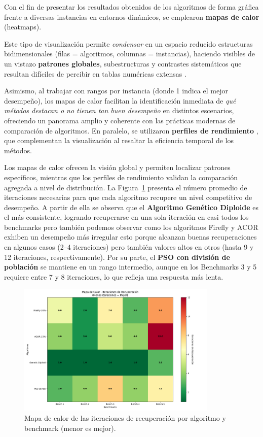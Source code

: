 \documentclass[10pt]{article}
\begin{document}
Con el fin de presentar los resultados obtenidos de los algoritmos de forma gráfica frente a diversas instancias en entornos dinámicos, se emplearon \textbf{mapas de calor} (heatmaps).

Este tipo de visualización permite \textit{condensar} en un espacio reducido estructuras bidimensionales (filas = algoritmos, columnas = instancias), haciendo visibles de un vistazo \textbf{patrones globales}, subestructuras y contrastes sistemáticos que resultan difíciles de percibir en tablas numéricas extensas \citep{wilkinson2009clusterheatmap}. 

Asimismo, al trabajar con rangos por instancia (donde 1 indica el mejor desempeño), los mapas de calor facilitan la identificación inmediata de \textit{qué métodos destacan o no tienen tan buen desempeño} en distintos escenarios, ofreciendo un panorama amplio y coherente con las prácticas modernas de comparación de algoritmos. En paralelo, se utilizaron \textbf{perfiles de rendimiento} \citep{dolan2002performanceprofiles}, que complementan la visualización al resaltar la eficiencia temporal de los métodos. 

Los mapas de calor ofrecen la visión global y permiten localizar patrones específicos, mientras que los perfiles de rendimiento validan la comparación agregada a nivel de distribución. La Figura~\ref{fig:heatmap} presenta el número promedio de iteraciones necesarias para que cada algoritmo recupere un nivel competitivo de desempeño. A partir de ella se observa que el \textbf{Algoritmo Genético Diploide} es el más consistente, logrando recuperarse en una sola iteración en casi todos los benchmarks pero también podemos observar como los algoritmos Firefly y ACOR exhiben un desempeño más irregular esto porque alcanzan buenas recuperaciones en algunos casos (2--4 iteraciones) pero también valores altos en otros (hasta 9 y 12 iteraciones, respectivamente). Por su parte, el \textbf{PSO con división de población} se mantiene en un rango intermedio, aunque en los Benchmarks 3 y 5 requiere entre 7 y 8 iteraciones, lo que refleja una respuesta más lenta.

\begin{figure}[H]
    \centering
    \includegraphics[width=0.85\textwidth]{imagenes/mapaDeCalor.png}
    \caption{Mapa de calor de las iteraciones de recuperación por algoritmo y benchmark (menor es mejor).}
    \label{fig:heatmap}
\end{figure}
\end{document}
